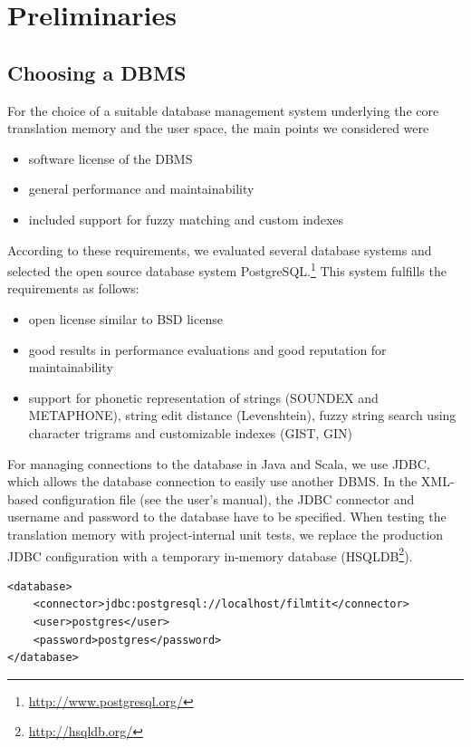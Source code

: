 \section{Preliminaries}

\subsection{Choosing a DBMS}

For the choice of a suitable database management system underlying the
core translation memory and the user space, the main points we
considered were

\begin{itemize}
\item
  software license of the DBMS
\item
  general performance and maintainability
\item
  included support for fuzzy matching and custom indexes
\end{itemize}
According to these requirements, we evaluated several database systems
and selected the open source database system
PostgreSQL.\footnote{\url{http://www.postgresql.org/}} This system
fulfills the requirements as follows:

\begin{itemize}
\item
  open license similar to BSD license
\item
  good results in performance evaluations and good reputation for
  maintainability
\item
  support for phonetic representation of strings (SOUNDEX and
  METAPHONE), string edit distance (Levenshtein), fuzzy string search
  using character trigrams and customizable indexes (GIST, GIN)
\end{itemize}

For managing connections to the database in Java and Scala, we use JDBC, 
which allows the database connection to easily use another DBMS. 
In the XML-based configuration file (see the user's manual), the JDBC connector
and username and password to the database have to be specified. When testing the
translation memory with project-internal unit tests, we replace the production JDBC
configuration with a temporary in-memory database (HSQLDB\footnote{\url{http://hsqldb.org/}}).

\begin{lstlisting}
<database>
    <connector>jdbc:postgresql://localhost/filmtit</connector>
    <user>postgres</user>
    <password>postgres</password>
</database>
\end{lstlisting}


